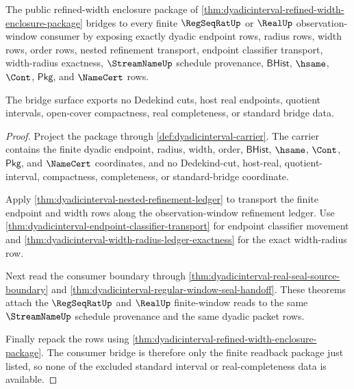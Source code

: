 \begin{theorem}
\label{thm:dyadicinterval-public-regseq-real-bridge}
The public refined-width enclosure package of
\autoref{thm:dyadicinterval-refined-width-enclosure-package} bridges to every
finite $\RegSeqRatUp$ or $\RealUp$ observation-window consumer by exposing
exactly dyadic endpoint rows, radius rows, width rows, order rows, nested
refinement transport, endpoint classifier transport, width-radius exactness,
$\StreamNameUp$ schedule provenance, $\mathsf{BHist}$, $\hsame$, $\Cont$,
$\mathsf{Pkg}$, and $\NameCert$ rows.

The bridge surface exports no Dedekind cuts, host real endpoints, quotient
intervals, open-cover compactness, real completeness, or standard bridge data.
\end{theorem}
\begin{proof}
Project the package through \autoref{def:dyadicinterval-carrier}. The carrier
contains the finite dyadic endpoint, radius, width, order, $\mathsf{BHist}$,
$\hsame$, $\Cont$, $\mathsf{Pkg}$, and $\NameCert$ coordinates, and no
Dedekind-cut, host-real, quotient-interval, compactness, completeness, or
standard-bridge coordinate.

Apply \autoref{thm:dyadicinterval-nested-refinement-ledger} to transport the
finite endpoint and width rows along the observation-window refinement ledger.
Use \autoref{thm:dyadicinterval-endpoint-classifier-transport} for endpoint
classifier movement and \autoref{thm:dyadicinterval-width-radius-ledger-exactness}
for the exact width-radius row.

Next read the consumer boundary through
\autoref{thm:dyadicinterval-real-seal-source-boundary} and
\autoref{thm:dyadicinterval-regular-window-seal-handoff}. These theorems attach
the $\RegSeqRatUp$ and $\RealUp$ finite-window reads to the same
$\StreamNameUp$ schedule provenance and the same dyadic packet rows.

Finally repack the rows using
\autoref{thm:dyadicinterval-refined-width-enclosure-package}. The consumer
bridge is therefore only the finite readback package just listed, so none of
the excluded standard interval or real-completeness data is available.
\end{proof}

